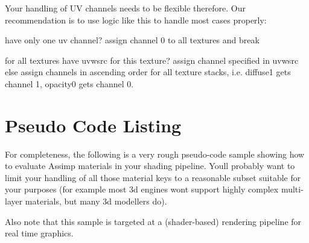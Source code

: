 Your handling of U\+V channels needs to be flexible therefore. Our recommendation is to use logic like this to handle most cases properly\+:

\begin{DoxyVerb}have only one uv channel?
   assign channel 0 to all textures and break

for all textures
   have uvwsrc for this texture?
      assign channel specified in uvwsrc
   else
      assign channels in ascending order for all texture stacks, 
        i.e. diffuse1 gets channel 1, opacity0 gets channel 0.\end{DoxyVerb}
\hypertarget{materials_pseudo}{}\section{Pseudo Code Listing}\label{materials_pseudo}
For completeness, the following is a very rough pseudo-\/code sample showing how to evaluate Assimp materials in your shading pipeline. You\textquotesingle{}ll probably want to limit your handling of all those material keys to a reasonable subset suitable for your purposes (for example most 3d engines won\textquotesingle{}t support highly complex multi-\/layer materials, but many 3d modellers do).

Also note that this sample is targeted at a (shader-\/based) rendering pipeline for real time graphics.


